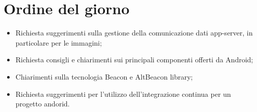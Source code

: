 \documentclass[../template.tex]{subfiles}
\begin{document}
\section{Ordine del giorno}
\begin{itemize}
	\item Richiesta suggerimenti sulla gestione della comunicazione dati app-server, in particolare per le immagini;
	\item Richiesta consigli e chiarimenti sui principali componenti offerti da Android;
	\item Chiarimenti sulla tecnologia Beacon e AltBeacon library;
	\item Richiesta suggerimenti per l'utilizzo dell'integrazione continua per un progetto andorid.
\end{itemize}
\end{document}
